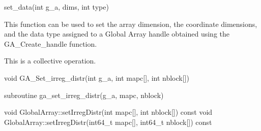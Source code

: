 \documentclass[12pt]{article}
\begin{document}
\begin{pyapi}
\begin{pycode}
set_data(int g_a, dims, int type)
\end{pycode}
\end{pyapi}
\gcoll

\begin{desc}

  This function can be used to set the array dimension, the coordinate
  dimensions, and the data type assigned to a Global Array handle
  obtained using the GA_Create_handle function.

  This is a collective operation.
\end{desc}



\begin{capi}
\begin{ccode}
void GA_Set_irreg_distr(int g_a, int mapc[], int nblock[])
\end{ccode}
\begin{funcargs}
\end{funcargs}
\end{capi}

\begin{fapi}
\begin{fcode}
subroutine ga_set_irreg_distr(g_a, mapc, nblock)
\end{fcode}
\begin{funcargs}
\end{funcargs}
\end{fapi}

\begin{cxxapi}
\begin{cxxcode}
void GlobalArray::setIrregDistr(int mapc[], int nblock[]) const
void GlobalArray::setIrregDistr(int64_t mapc[], int64_t nblock[]) const
\end{cxxcode}
\begin{funcargs}
\end{funcargs}
\end{cxxapi}
\end{document}
